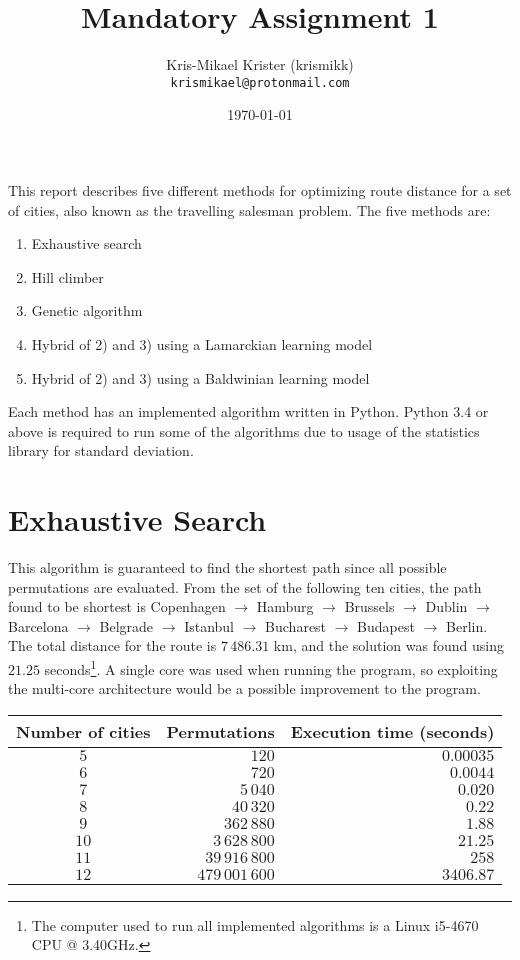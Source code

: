 \documentclass{article}
\title{Mandatory Assignment 1}
\author{Kris-Mikael Krister (krismikk)\\\texttt{krismikael@protonmail.com}}
\date{\today}
\begin{document}
\maketitle

\noindent This report describes five different methods for optimizing route distance for a set of cities, also known as the travelling salesman problem. The five methods are:

\begin{enumerate}
    \item Exhaustive search
    \item Hill climber
    \item Genetic algorithm
    \item Hybrid of 2) and 3) using a Lamarckian learning model
    \item Hybrid of 2) and 3) using a Baldwinian learning model
\end{enumerate}

\noindent Each method has an implemented algorithm written in Python. Python 3.4 or above is required to run some of the algorithms due to usage of the statistics library for standard deviation.

\section*{Exhaustive Search}

This algorithm is guaranteed to find the shortest path since all possible permutations are evaluated. From the set of the following ten cities, the path found to be shortest is Copenhagen $\rightarrow$ Hamburg $\rightarrow$ Brussels $\rightarrow$ Dublin $\rightarrow$ Barcelona $\rightarrow$ Belgrade $\rightarrow$ Istanbul $\rightarrow$ Bucharest $\rightarrow$ Budapest $\rightarrow$ Berlin. The total distance for the route is $7\,486.31$ km, and the solution was found using $21.25$ seconds\footnote{The computer used to run all implemented algorithms is a Linux i5-4670 CPU @ 3.40GHz.}. A single core was used when running the program, so exploiting the multi-core architecture would be a possible improvement to the program.  \\

\begin{center}
\begin{tabular}{crr}
\toprule
Number of cities & Permutations & Execution time (seconds)\\
\midrule
$5$ & $120$ & $0.00035$ \\
$6$ & $720$ & $0.0044$ \\
$7$ & $5\,040$ & $0.020$ \\
$8$ & $40\,320$ & $0.22$ \\
$9$ & $362\,880$ & $1.88$ \\
$10$ & $3\,628\,800$ & $21.25$ \\
$11$ & $39\,916\,800$ & $258$ \\
$12$ & $479\,001\,600$ & $3406.87$ \\
\bottomrule
\end{tabular}
\end{center}
\end{document}
